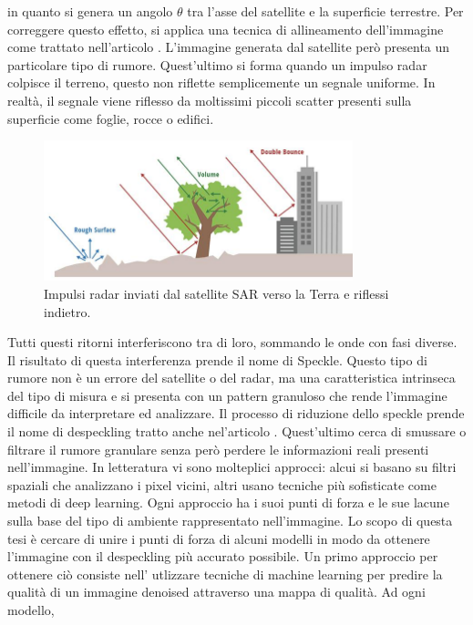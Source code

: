 in quanto si genera un angolo $\theta$ tra l’asse del satellite e la superficie terrestre. 
Per correggere questo effetto, si applica una tecnica di allineamento dell’immagine come trattato nell'articolo \cite{HUGHES2020166}.
L'immagine generata dal satellite però presenta un particolare tipo di rumore. Quest'ultimo si forma quando un impulso radar colpisce il terreno, 
questo non riflette semplicemente un segnale uniforme. In realtà, il segnale viene riflesso da 
moltissimi piccoli scatter presenti sulla superficie come foglie, rocce o edifici. 
\begin{figure}[H]
    \centering
    \includegraphics[width=0.8\textwidth]{utils/SARPolarization.jpg}
    \caption{Impulsi radar inviati dal satellite SAR verso la Terra e riflessi indietro.}
    \label{fig:sar_scatter}
\end{figure}
Tutti questi ritorni interferiscono tra di loro, sommando le onde con fasi diverse. Il risultato di questa 
interferenza prende il nome di Speckle. Questo tipo di rumore non è un errore del satellite o 
del radar, ma una caratteristica intrinseca del tipo di misura e si presenta con un pattern granuloso
che rende l'immagine difficile da interpretare ed analizzare.
Il processo di riduzione dello speckle 
prende il nome di despeckling tratto anche nel'articolo \cite{1097762}. Quest'ultimo cerca di smussare o filtrare il rumore granulare senza 
però perdere le informazioni reali presenti nell'immagine. In letteratura vi sono molteplici 
approcci: alcui si basano su filtri spaziali che analizzano i pixel vicini, altri usano tecniche 
più sofisticate come metodi di deep learning. Ogni approccio ha i suoi
punti di forza e le sue lacune sulla base del tipo di ambiente rappresentato nell'immagine. 
Lo scopo di questa tesi è cercare di unire i punti di forza di alcuni modelli in modo da ottenere l’immagine
con il despeckling più accurato possibile. Un primo approccio per ottenere ciò consiste nell' utlizzare tecniche di machine learning
per predire la qualità di un immagine denoised attraverso una mappa di qualità. Ad ogni modello,
